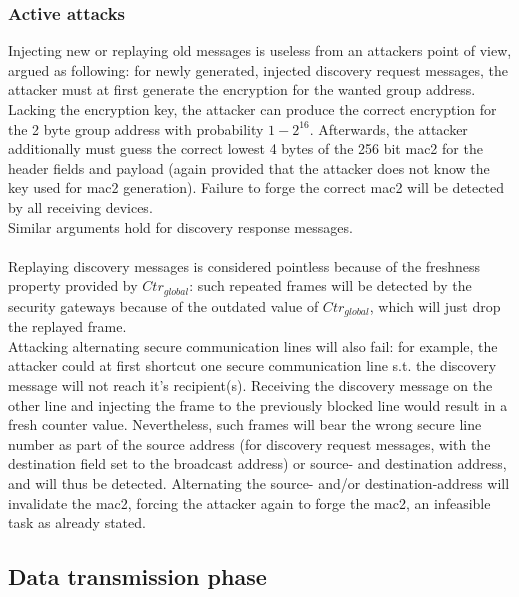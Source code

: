 \subsubsection{Active attacks}
Injecting new or replaying old messages is useless from an attackers point of view, argued as following: for newly generated, injected discovery request messages, the attacker must at first
generate the encryption for the wanted group address. Lacking the encryption key, the attacker can produce the correct encryption for the 2 byte group address with probability
$1-2^{16}$. Afterwards, the attacker additionally must guess the correct lowest 4 bytes of the 256 bit \gls{mac2} for the header fields and payload (again provided that the attacker
does not know the key used for \gls{mac2} generation). Failure to forge the correct \gls{mac2} will be detected by all receiving devices.
\\
Similar arguments hold for discovery response messages.
\\
\\
Replaying discovery messages is considered pointless because of the freshness property provided by $Ctr_{global}$: such repeated frames will be detected by the security gateways
because of the outdated value of $Ctr_{global}$, which will just drop the replayed frame. 
\\
Attacking alternating secure communication lines will also fail: for example, the attacker could at first
shortcut one secure communication line s.t. the discovery message will not reach it's recipient(s). Receiving the discovery message on the other line and injecting the frame to the
previously blocked line would result in a fresh counter value. Nevertheless, such frames will bear the wrong secure line number as part of the source address (for discovery request
messages, with the destination field set to the broadcast address) or source- and destination address, and will thus be detected.
Alternating the source- and/or destination-address will invalidate the \gls{mac2}, forcing the attacker again to forge the \gls{mac2}, an infeasible task as already stated.

\subsection{Data transmission phase}

